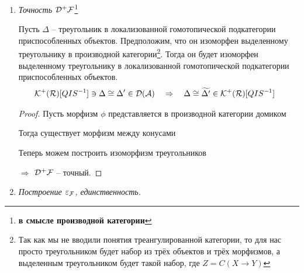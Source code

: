 \documentclass[../main.tex]{subfiles}
\begin{document}
\begin{enumerate}
     \item \textit{Точность $\mathcal{D^+ F}$}\footnote{\textbf{в смысле производной категории}}
\begin{to_lem}
Пусть $\Delta$ -- треугольник в локализованной гомотопической подкатегории приспособленных объектов. Предположим, что он изоморфен выделенному треугольнику в производной категории\footnote{Так как мы не вводили понятия треангулированной категории, то для нас просто треугольником будет набор из трёх объектов и трёх морфизмов, а выделенным треугольником будет такой набор, где $Z = C(X \to Y)$}. Тогда он будет изоморфен выделенному треугольнику в локализованной гомотопической подкатегории приспособленных объектов.
\begin{align*}
    \mathcal{K^+(\mathcal{R})}[QIS^{-1}] \ni \Delta &\cong \Delta' \in \mathcal{D(\mathcal{A})} \quad \Rightarrow \quad \Delta \cong \widetilde{\Delta'} \in \mathcal{K^+(R)}[QIS^{-1}]
\end{align*}
\end{to_lem}
\begin{proof}
    \bee
{}
    \eee
Пусть морфизм $\phi$ представляется  в производной категории домиком
    \bee
{}
    \eee
    Тогда существует морфизм между конусами 
    \bee
    \eee
    Теперь можем построить изоморфизм треугольников
    \bee
    \eee
    $\Rightarrow$ $\mathcal{D^+ F}$ -- точный.
\end{proof}
     \item \textit{Построение $\varepsilon_{\mathcal{F}}$, единственность.}

\end{enumerate}
\end{document}
